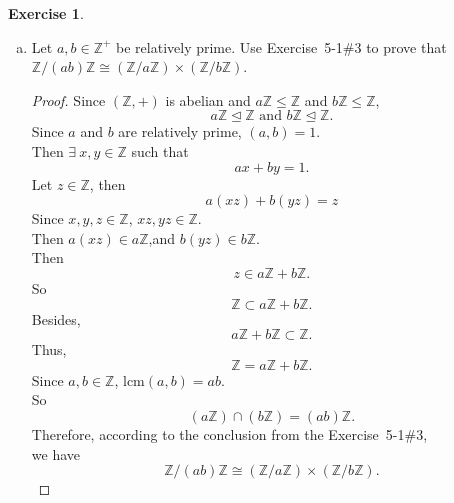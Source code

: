 \documentclass{amsart}
\newcommand{\bbz}{\mathbb{Z}}
\theoremstyle{plain}
\theoremstyle{definition}
\newtheorem{exer}[lem]{Exercise}
\begin{document}
\begin{exer}
\begin{enumerate}[(a)]
\item Let $a,b\in\bbz^+$ be relatively prime. Use Exercise~5-1\#3
to prove that $\bbz/(ab)\bbz\cong(\bbz/a\bbz)\times(\bbz/b\bbz)$.
\begin{proof}
 	 Since $(\bbz, +)$ is abelian and $a\bbz \leq \bbz$ and $b\bbz \leq \bbz$,
	 \[a\bbz \unlhd \bbz \text{ and } b\bbz \unlhd \bbz.\]
	 Since $a$ and $b$ are relatively prime, $(a,b) = 1$.\\
	 Then $\exists \ x,y\in \bbz$ such that
	 \[ax+by = 1.\]
	 Let $z \in \bbz$, then 
	 \[a(xz) + b(yz) = z\]
	 Since $x,y,z\in\bbz$, $xz,yz \in \bbz$.\\
	 Then 
	 $a(xz) \in a\bbz$,and $b(yz) \in b\bbz$.\\
	 Then 
	 \[z \in a\bbz + b\bbz.\]
	 So
	 \[\bbz \subset a\bbz + b\bbz.\]
	 Besides, 
	 \[ a\bbz + b\bbz \subset \bbz.\]
	 Thus,
	 \[\bbz = a\bbz + b\bbz.\]	
	 Since $a,b \in \bbz$, $\text{lcm}(a,b) = ab$.\\
	 So 
	 \[(a\bbz)\cap (b\bbz) = (ab)\bbz.\]
	 Therefore, according to the conclusion from the Exercise~5-1\#3, \\
	 we have
	 \[\bbz/(ab)\bbz\cong(\bbz/a\bbz)\times(\bbz/b\bbz).\]
\end{proof}


\end{enumerate}
\end{exer}
\end{document}
